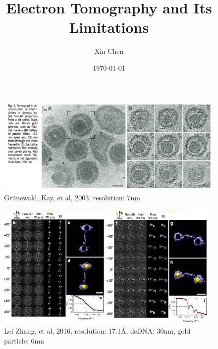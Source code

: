 \documentclass[slidestop,compress,12pt]{beamer}
\title{Electron Tomography and Its Limitations}
\author{Xin Chen}
\date{\today}
\begin{document}
\def\mean#1{\left< #1 \right>}
\frame{\titlepage}

\section[Achievements]{}

\begin{frame}
    \begin{figure}
        \includegraphics[width=12cm]{imgs/eg1.png}
        \caption{Grünewald, Kay, et al, 2003, resolution: 7nm}
    \end{figure}
\end{frame}

\begin{frame}
    \begin{figure}
        \includegraphics[width=11cm]{imgs/eg2.png}
        \caption{Lei Zhang, et al, 2016, resolution: 17.1\AA, dsDNA:  30nm, gold particle: 6nm}
    \end{figure}
\end{frame}
\end{document}
